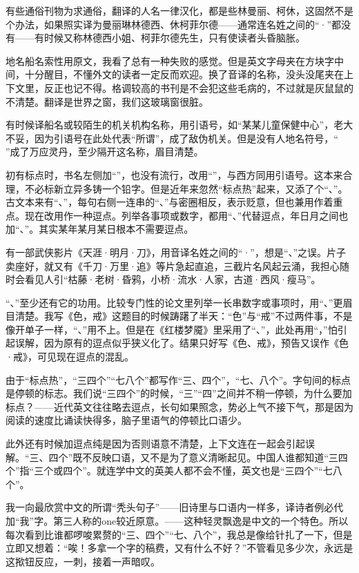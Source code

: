 \par 有些通俗刊物为求通俗，翻译的人名一律汉化，都是些林曼丽、柯休，这固然不是个办法，如果照实译为曼丽琳林德西、休柯菲尔德——通常连名姓之间的“·”都没有——有时候又称林德西小姐、柯菲尔德先生，只有使读者头昏脑胀。
\par 地名船名索性用原文，我看了总有一种失败的感觉。但是英文字母夹在方块字中间，十分醒目，不懂外文的读者一定反而欢迎。换了音译的名称，没头没尾夹在上下文里，反正也记不得。格调较高的书刊是不会犯这些毛病的，不过就是灰鼠鼠的不清楚。翻译是世界之窗，我们这玻璃窗很脏。
\par 有时候译船名或较陌生的机关机构名称，用引语号，如“某某儿童保健中心”，老大不妥，因为引语号在此处代表“所谓”，成了敌伪机关。但是没有人地名符号，“ ”成了万应灵丹，至少隔开这名称，眉目清楚。
\par 初有标点时，书名左侧加“\uwave{\ \ \ }”，也没有流行，改用“”，与西方同用引语号。这本来合理，不必标新立异多铸一个铅字。但是近年来忽然“标点热”起来，又添了个“、”。古文本来有“、”，每句右侧一连串的“、”与密圈相反，表示贬意，但也兼用作着重点。现在改用作一种逗点。列举各事项或数字，都用“、”代替逗点，年日月之间也加“、”。其实某年某月某日根本不需要逗点。
\par 有一部武侠影片《天涯·明月·刀》，用音译名姓之间的“·”，想是“、”之误。片子卖座好，就又有《千刀·万里·追》等片急起直追，三截片名风起云涌，我担心随时会看见人引“枯藤·老树·昏鸦，小桥·流水·人家，古道·西风·瘦马”。
\par “、”至少还有它的功用。比较专门性的论文里列举一长串数字或事项时，用“、”更眉目清楚。我写《色，戒》这题目的时候踌躇了半天：“色”与“戒”不过两件事，不是像开单子一样，“、”用不上。但是在《红楼梦魇》里采用了“、”，此处再用“，”怕引起误解，因为原有的逗点似乎狭义化了。结果只好写《色、戒》，预告又误作《色·戒》，可见现在逗点的混乱。
\par 由于“标点热”，“三四个”“七八个”都写作“三、四个”，“七、八个”。字句间的标点是停顿的标志。我们说“三四个”的时候，“三”“四”之间并不稍一停顿，为什么要加标点？——近代英文往往略去逗点，长句如果照念，势必上气不接下气，那是因为阅读的速度比诵读快得多，脑子里语气的停顿比口语少。
\par 此外还有时候加逗点纯是因为否则语意不清楚，上下文连在一起会引起误解。“三、四个”既不反映口语，又不是为了意义清晰起见。中国人谁都知道“三四个”指“三个或四个”。就连学中文的英美人都不会不懂，英文也是“三四个”“七八个”。
\par 我一向最欣赏中文的所谓“秃头句子”——旧诗里与口语内一样多，译诗者例必代加“我”字。第三人称的one较近原意。——这种轻灵飘逸是中文的一个特色。所以每次看到比谁都啰唆累赘的“三、四个”“七、八个”，我总是像给针扎了一下，但是立即又想着：“唉！多拿一个字的稿费，又有什么不好？”不管看见多少次，永远是这揿钮反应，一刺，接着一声暗叹。
